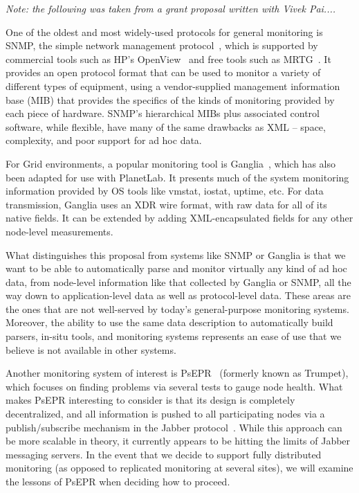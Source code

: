 {\em Note: the following was taken from a grant proposal written with Vivek
Pai....  }

One of the oldest and most widely-used protocols for general monitoring
is SNMP, the simple network management protocol~\cite{snmprfc1157},
which is supported by commercial tools such as HP's
OpenView~\cite{openview} and free tools such as MRTG~\cite{mrtg}. It
provides an open protocol format that can be used to monitor a variety
of different types of equipment, using a vendor-supplied management
information base (MIB) that provides the specifics of the kinds of
monitoring provided by each piece of hardware. SNMP's hierarchical
MIBs plus associated control software, while flexible, have many of
the same drawbacks as XML -- space, complexity, and poor support for
ad hoc data.

For Grid environments, a popular monitoring tool is
Ganglia~\cite{ganglia}, which has also been adapted for use with
PlanetLab. It presents much of the system monitoring information
provided by OS tools like vmstat, iostat, uptime, etc. For data
transmission, Ganglia uses an XDR wire format, with raw data for all
of its native fields.  It can be extended by adding XML-encapsulated
fields for any other node-level measurements. 

What distinguishes this proposal from systems like SNMP or Ganglia is
that we want to be able to automatically parse and monitor virtually
any kind of ad hoc data, from node-level information like that
collected by Ganglia or SNMP, all the way down to application-level
data as well as protocol-level data. These areas are the ones that are
not well-served by today's general-purpose monitoring
systems. Moreover, the ability to use the same data description to
automatically build parsers, in-situ tools, and monitoring systems
represents an ease of use that we believe is not available in other
systems.

Another monitoring system of interest is PsEPR~\cite{psepr} (formerly
known as Trumpet), which focuses on finding problems via several tests
to gauge node health. What makes PsEPR interesting to consider is that
its design is completely decentralized, and all information is pushed
to all participating nodes via a publish/subscribe mechanism in the
Jabber protocol~\cite{jabber}. While this approach can be more
scalable in theory, it currently appears to be hitting the limits of
Jabber messaging servers. In the event that we decide to support
fully distributed monitoring (as opposed to replicated monitoring at
several sites), we will examine the lessons of PsEPR when deciding how
to proceed.

